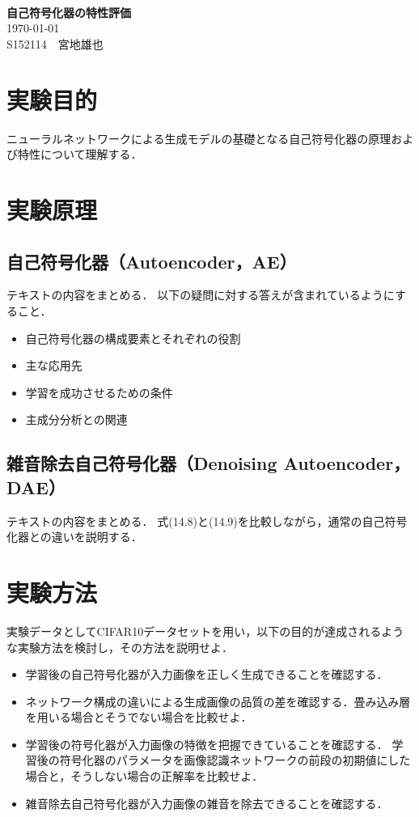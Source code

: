 \documentclass[12pt]{jsarticle}
\newcommand{\frontpage}[3]{%
\begin{center}
　\\
\vspace{15em}{\LARGE{}レポート課題}\\
　\\
{\Huge\bf#1}\\
\vspace{30em}
{\LARGE\today}\\
\vspace{2em}
{\LARGE#2　#3}
\end{center}
\thispagestyle{empty}
\clearpage
\setcounter{page}{1}
}
\begin{document}
\frontpage
{自己符号化器の特性評価}
{S152114}
{宮地雄也}

\section{実験目的}

ニューラルネットワークによる生成モデルの基礎となる自己符号化器の原理および特性について理解する．

\section{実験原理}

\subsection{自己符号化器（Autoencoder，AE）}

テキストの内容をまとめる．
以下の疑問に対する答えが含まれているようにすること．
\begin{itemize}
\item 自己符号化器の構成要素とそれぞれの役割
\item 主な応用先
\item 学習を成功させるための条件
\item 主成分分析との関連
\end{itemize}

\subsection{雑音除去自己符号化器（Denoising Autoencoder，DAE）}

テキストの内容をまとめる．
式(14.8)と(14.9)を比較しながら，通常の自己符号化器との違いを説明する．


\section{実験方法}

実験データとしてCIFAR10データセットを用い，以下の目的が達成されるような実験方法を検討し，その方法を説明せよ．

\begin{itemize}
\item 学習後の自己符号化器が入力画像を正しく生成できることを確認する．
\item ネットワーク構成の違いによる生成画像の品質の差を確認する．畳み込み層を用いる場合とそうでない場合を比較せよ．
\item 学習後の符号化器が入力画像の特徴を把握できていることを確認する．
学習後の符号化器のパラメータを画像認識ネットワークの前段の初期値にした場合と，そうしない場合の正解率を比較せよ．
\item 雑音除去自己符号化器が入力画像の雑音を除去できることを確認する．
\end{itemize}
\end{document}
